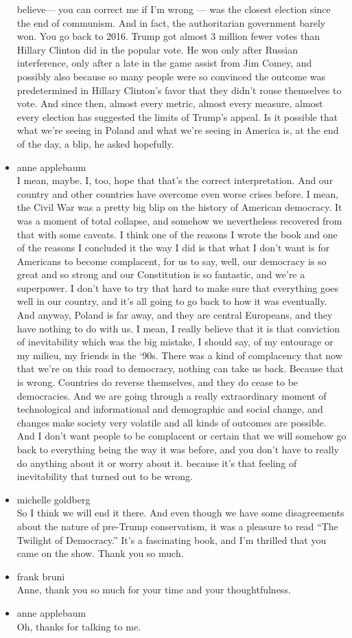 \begin{itemize}
  believe--- you can correct me if I'm wrong --- was the closest
  election since the end of communism. And in fact, the authoritarian
  government barely won. You go back to 2016. Trump got almost 3 million
  fewer votes than Hillary Clinton did in the popular vote. He won only
  after Russian interference, only after a late in the game assist from
  Jim Comey, and possibly also because so many people were so convinced
  the outcome was predetermined in Hillary Clinton's favor that they
  didn't rouse themselves to vote. And since then, almost every metric,
  almost every measure, almost every election has suggested the limits
  of Trump's appeal. Is it possible that what we're seeing in Poland and
  what we're seeing in America is, at the end of the day, a blip, he
  asked hopefully.
\item
  anne applebaum\\
  I mean, maybe. I, too, hope that that's the correct interpretation.
  And our country and other countries have overcome even worse crises
  before. I mean, the Civil War was a pretty big blip on the history of
  American democracy. It was a moment of total collapse, and somehow we
  nevertheless recovered from that with some caveats. I think one of the
  reasons I wrote the book and one of the reasons I concluded it the way
  I did is that what I don't want is for Americans to become complacent,
  for us to say, well, our democracy is so great and so strong and our
  Constitution is so fantastic, and we're a superpower. I don't have to
  try that hard to make sure that everything goes well in our country,
  and it's all going to go back to how it was eventually. And anyway,
  Poland is far away, and they are central Europeans, and they have
  nothing to do with us. I mean, I really believe that it is that
  conviction of inevitability which was the big mistake, I should say,
  of my entourage or my milieu, my friends in the `90s. There was a kind
  of complacency that now that we're on this road to democracy, nothing
  can take us back. Because that is wrong. Countries do reverse
  themselves, and they do cease to be democracies. And we are going
  through a really extraordinary moment of technological and
  informational and demographic and social change, and changes make
  society very volatile and all kinds of outcomes are possible. And I
  don't want people to be complacent or certain that we will somehow go
  back to everything being the way it was before, and you don't have to
  really do anything about it or worry about it. because it's that
  feeling of inevitability that turned out to be wrong.
\item
  michelle goldberg\\
  So I think we will end it there. And even though we have some
  disagreements about the nature of pre-Trump conservatism, it was a
  pleasure to read ``The Twilight of Democracy.'' It's a fascinating
  book, and I'm thrilled that you came on the show. Thank you so much.
\item
  frank bruni\\
  Anne, thank you so much for your time and your thoughtfulness.
\item
  anne applebaum\\
  Oh, thanks for talking to me.


\end{itemize}

